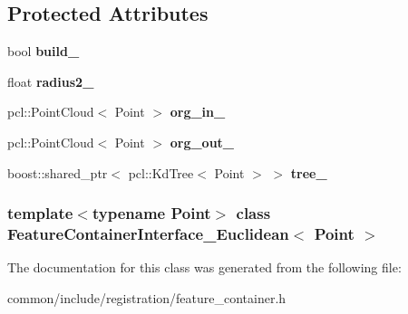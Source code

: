 \subsection*{Protected Attributes}
\begin{DoxyCompactItemize}
\item 
\hypertarget{classFeatureContainerInterface__Euclidean_a3cdddedc9eaffa1904130e44b1991837}{
bool {\bfseries build\_\-}}
\label{classFeatureContainerInterface__Euclidean_a3cdddedc9eaffa1904130e44b1991837}

\item 
\hypertarget{classFeatureContainerInterface__Euclidean_a911fef526cc7c6e25e0fd3a301cbd09b}{
float {\bfseries radius2\_\-}}
\label{classFeatureContainerInterface__Euclidean_a911fef526cc7c6e25e0fd3a301cbd09b}

\item 
\hypertarget{classFeatureContainerInterface__Euclidean_a0f447e12451abb8eb49fcf574758f588}{
pcl::PointCloud$<$ Point $>$ {\bfseries org\_\-in\_\-}}
\label{classFeatureContainerInterface__Euclidean_a0f447e12451abb8eb49fcf574758f588}

\item 
\hypertarget{classFeatureContainerInterface__Euclidean_abac547071ead25c6c676b56a2d5dee20}{
pcl::PointCloud$<$ Point $>$ {\bfseries org\_\-out\_\-}}
\label{classFeatureContainerInterface__Euclidean_abac547071ead25c6c676b56a2d5dee20}

\item 
\hypertarget{classFeatureContainerInterface__Euclidean_a283c12b73d04f8d5fe2e2a3d04d1b7a1}{
boost::shared\_\-ptr$<$ pcl::KdTree$<$ Point $>$ $>$ {\bfseries tree\_\-}}
\label{classFeatureContainerInterface__Euclidean_a283c12b73d04f8d5fe2e2a3d04d1b7a1}

\end{DoxyCompactItemize}
\subsubsection*{template$<$typename Point$>$ class FeatureContainerInterface\_\-Euclidean$<$ Point $>$}



The documentation for this class was generated from the following file:\begin{DoxyCompactItemize}
\item 
common/include/registration/feature\_\-container.h\end{DoxyCompactItemize}

